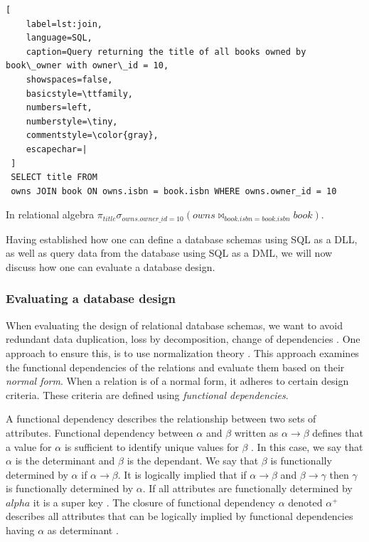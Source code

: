 \begin{lstlisting}[
    label=lst:join,
    language=SQL,
    caption=Query returning the title of all books owned by book\_owner with owner\_id = 10,
    showspaces=false,
    basicstyle=\ttfamily,
    numbers=left,
    numberstyle=\tiny,
    commentstyle=\color{gray},
    escapechar=|
 ]
 SELECT title FROM
 owns JOIN book ON owns.isbn = book.isbn WHERE owns.owner_id = 10  
\end{lstlisting}

In relational algebra $\pi_{title}\sigma_{owns.owner\_id = 10}(owns \Join_{book.isbn = book.isbn} book )$.

Having established how one can define a database schemas using SQL as a DLL, as well as query data from the database using SQL as a DML, we will now discuss how one can evaluate a database design.


\subsubsection*{Evaluating a database design}
When evaluating the design of relational database schemas, we want to avoid redundant data duplication, loss by decomposition, change of dependencies \cite[Chapter 7, Chapter 7.3.3]{DBSBook}.
One approach to ensure this, is to use normalization theory \cite[Chapter 7.1.3]{DBSBook}. This approach examines the functional dependencies of the relations and evaluate them based on their \textit{normal form}.
When a relation is of a normal form, it adheres to certain design criteria. These criteria are defined using \textit{functional dependencies}.

A functional dependency describes the relationship between two sets of attributes. 
Functional dependency between $\alpha$ and $\beta$ written as $\alpha \rightarrow \beta$ defines that a value for $\alpha$ is sufficient to identify unique values for $\beta$ \cite[Chapter 7.4]{DBSBook}.
In this case, we say that $\alpha$ is the determinant and $\beta$ is the dependant. 
We say that $\beta$ is functionally determined by $\alpha$ if $\alpha \rightarrow \beta$.
It is logically implied that if $\alpha \rightarrow \beta$ and $\beta \rightarrow \gamma$ then $\gamma$ is functionally determined by $\alpha$.
If all attributes are functionally determined by $alpha$ it is a super key \cite[Chapter 7.4.2]{DBSBook}.
The closure of functional dependency $\alpha$ denoted $\alpha^+$ describes all attributes that can be logically implied by functional dependencies having $\alpha$ as determinant \cite[Chapter]{DBSBook}. 

